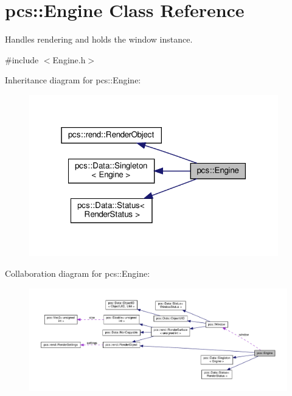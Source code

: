 \hypertarget{classpcs_1_1Engine}{}\section{pcs\+:\+:Engine Class Reference}
\label{classpcs_1_1Engine}


Handles rendering and holds the window instance.  




{\ttfamily \#include $<$Engine.\+h$>$}



Inheritance diagram for pcs\+:\+:Engine\+:\nopagebreak
\begin{figure}[H]
\begin{center}
\leavevmode
\includegraphics[width=307pt]{classpcs_1_1Engine__inherit__graph}
\end{center}
\end{figure}


Collaboration diagram for pcs\+:\+:Engine\+:\nopagebreak
\begin{figure}[H]
\begin{center}
\leavevmode
\includegraphics[width=350pt]{classpcs_1_1Engine__coll__graph}
\end{center}
\end{figure}
